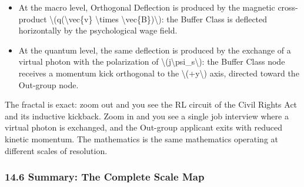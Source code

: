 {\begin{itemize}
\tightlist
\item
  At the macro level, Orthogonal Deflection is produced by the magnetic
  cross-product \textbackslash(q(\textbackslash vec\{v\}
  \textbackslash times \textbackslash vec\{B\})\textbackslash): the
  Buffer Class is deflected horizontally by the psychological wage
  field.
\item
  At the quantum level, the same deflection is produced by the exchange
  of a virtual photon with the polarization of
  \textbackslash(j\textbackslash psi\_s\textbackslash): the Buffer Class
  node receives a momentum kick orthogonal to the
  \textbackslash(+y\textbackslash) axis, directed toward the Out-group
  node.
\end{itemize}

The fractal is exact: zoom out and you see the RL circuit of the Civil
Rights Act and its inductive kickback. Zoom in and you see a single job
interview where a virtual photon is exchanged, and the Out-group
applicant exits with reduced kinetic momentum. The mathematics is the
same mathematics operating at different scales of resolution.

\subsubsection{14.6 Summary: The Complete Scale
Map}\label{summary-the-complete-scale-map}

}
